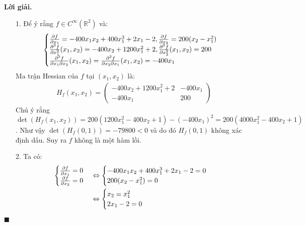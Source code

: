 \documentclass[12pt]{article}
\newcommand{\R}{\mathbb{R}}
\newenvironment{solution}{%
     \setlength\parindent{0pt}\par\medskip\textbf{Lời giải.}\quad}{%
     \hfill\tiny$\blacksquare$\par\medskip}
\begin{document}
    \begin{solution}
        \begin{enumerate}
            \item[1.] Để ý rằng $f \in C^{\infty}(\R^2)$ và:
            \begin{align*}
                \begin{cases}
                    \pdv{f}{x_1}(x_1,x_2) = -400x_1x_2 + 400x_1^3 + 2x_1 - 2, \pdv{f}{x_2}(x_1,x_2) = 200(x_2 - x_1^2)\\
                    \frac{\partial^2 f}{\partial x_1^2}(x_1,x_2) = -400x_2 + 1200x_1^2 + 2, \frac{\partial^2 f}{\partial x_2^2}(x_1,x_2) = 200\\
                    \frac{\partial^2 f}{\partial x_1 \partial x_2}(x_1,x_2) = \frac{\partial^2 f}{\partial x_2 \partial x_1}(x_1,x_2) = -400x_1
                \end{cases}
            \end{align*}
            Ma trận Hessian của $f$ tại $(x_1,x_2)$ là:
            \begin{align*}
                H_f(x_1,x_2) = \begin{pmatrix}
                    -400x_2 + 1200x_1^2 + 2 & -400x_1\\
                    -400x_1 & 200
                \end{pmatrix}
            \end{align*}
            Chú ý rằng $\det(H_f(x_1,x_2)) = 200(1200x_1^2 - 400x_2 + 1) - (-400x_1)^2 = 200(4000x_1^2 - 400x_2 + 1)$. Như vậy $\det(H_f(0, 1)) = -79800 < 0$ và do đó $H_f(0, 1)$ không xác định dấu. Suy ra $f$ không là một hàm lồi.
            \item[2.] Ta có:
            \begin{align*}
                \begin{cases}
                    \pdv{f}{x_1}(x_1,x_2) = 0\\
                    \pdv{f}{x_2}(x_1,x_2) = 0
                \end{cases} &\Leftrightarrow \begin{cases}
                    -400x_1x_2 + 400x_1^3 + 2x_1 - 2 = 0\\
                    200(x_2 - x_1^2) = 0
                \end{cases}\\ &\Leftrightarrow \begin{cases}
                    x_2 = x_1^2\\
                    2x_1 - 2 = 0

\end{cases}
\end{align*}
\end{enumerate}
\end{solution}
\end{document}
